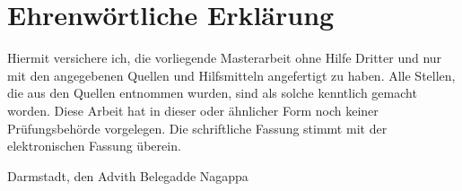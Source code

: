 \documentclass[longdoc,accentcolor=tud4b,11pt,paper=a4,colorback=tud4b]{tudreport}
\title{\komTitle}
\subtitle{\komThesisType}
\newcounter{dummy} %
\newcommand{\komThesisType}{Masterarbeit\xspace} %
\newcommand{\komName}{Advith Belegadde Nagappa\xspace}
\newcommand{\komSubmissionDate}{\xspace}%
\begin{document}
	\frenchspacing
	\raggedbottom
	\maketitle
	\chapter*{Ehrenw\"ortliche Erkl\"arung}
	Hiermit versichere ich, die vorliegende \komThesisType ohne Hilfe Dritter und nur mit den angegebenen Quellen
    und Hilfsmitteln angefertigt zu haben. Alle Stellen, die aus den Quellen entnommen wurden, sind als solche
    kenntlich gemacht worden. Diese Arbeit hat in dieser oder \"ahnlicher Form noch keiner Pr\"ufungsbeh\"orde vorgelegen.
    Die schriftliche Fassung stimmt mit der elektronischen Fassung \"uberein.
	\vspace{1.5cm}
	
	\noindent Darmstadt, den \komSubmissionDate\hfill \komName
	\pagebreak
	
	\tableofcontents
	\listoffigures
	\listoftables
	\pagebreak
	
	\printacronyms[include-classes=abbrev,name=Abbreviations]
	\cleardoublepage
	
	
	
	
	
	
	

	
	
\end{document}
